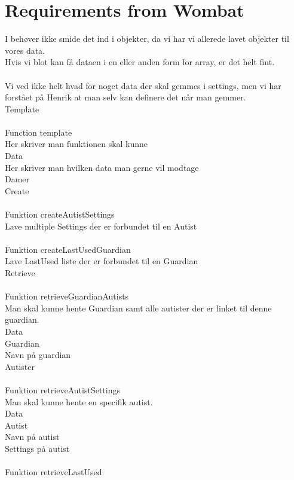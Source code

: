 \chapter{Requirements from Wombat}
\label{sec:timerreq}
I beh\o{}ver ikke smide det ind i objekter, da vi har vi allerede lavet objekter til vores data. \\
Hvis vi blot kan f\aa{} dataen i en eller anden form for array, er det helt fint. \\
\\
Vi ved ikke helt hvad for noget data der skal gemmes i settings, men vi har forst\aa{}et p\aa{} Henrik at man selv kan definere det n\aa{}r man gemmer.\\
Template\\
\\
Function template\\
Her skriver man funktionen skal kunne\\
Data\\
Her skriver man hvilken data man gerne vil modtage\\
Damer\\
Create\\
\\
Funktion createAutistSettings\\
Lave multiple Settings der er forbundet til en Autist\\
\\
Funktion createLastUsedGuardian\\
Lave LastUsed liste der er forbundet til en Guardian\\
Retrieve\\
\\
Funktion retrieveGuardianAutists\\
Man skal kunne hente Guardian samt alle autister der er linket til denne guardian.\\
Data\\
Guardian\\
Navn p\aa{} guardian\\
Autister\\
\\
Funktion retrieveAutistSettings\\
Man skal kunne hente en specifik autist.\\
Data\\
Autist\\
Navn p\aa{} autist\\
Settings p\aa{} autist\\
\\
Funktion retrieveLastUsed\\
